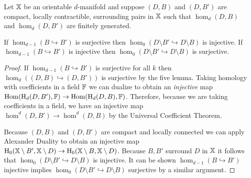 \begin{lemma}\label{lem:dual_ass}
  Let $\mathbb{X}$ be an orientable $d$-manifold and suppose $(D, B)$ and $(D, B')$ are compact, locally contractible, surrounding pairs in $\mathbb{X}$ such that $\hom_d(D, B)$ and $\hom_d(D, B')$ are finitely generated.

  If $\hom_{d-1}(B\hookrightarrow B')$ is surjective then $\hom_0(D\setminus B'\hookrightarrow D\setminus B)$ is injective.
  If $\hom_{d-1}(B\hookrightarrow B')$ is injective then $\hom_0(D\setminus B'\hookrightarrow D\setminus B)$ is surjective.
\end{lemma}
\begin{proof}
  If $\hom_{d-1}(B\hookrightarrow B')$ is surjective for all $k$ then $\hom_d((D, B)\hookrightarrow (D, B'))$ is surjective by the five lemma.
  Taking homology with coefficients in a field $\mathbb{F}$ we can dualize to obtain an \emph{injective} map $\mathrm{Hom}(\mathrm{H}_d(D,B'), \mathbb{F})\to \mathrm{Hom}(\mathrm{H}_d(D, B), \mathbb{F})$.
  Therefore, because we are taking coefficients in a field, we have an injective map $\hom^d(D,B')\to \hom^d(D, B)$ by the Universal Coefficient Theorem.

  Because $(D, B)$ and $(D,B')$ are compact and locally connected we can apply Alexander Duality to obtain an injective map $\mathrm{H}_0(\mathbb{X}\setminus B', \mathbb{X}\setminus D)\to\mathrm{H}_0(\mathbb{X}\setminus B, \mathbb{X}\setminus D)$.
  Because $B,B'$ surround $D$ in $\mathbb{X}$ it follows that $\hom_0(D\setminus B'\hookrightarrow D\setminus B)$ is injective.
  It can be shown $\hom_{d-1}(B\hookrightarrow B')$ injective implies $\hom_0(D\setminus B'\hookrightarrow D\setminus B)$ surjective by a similar argument.
\end{proof}

